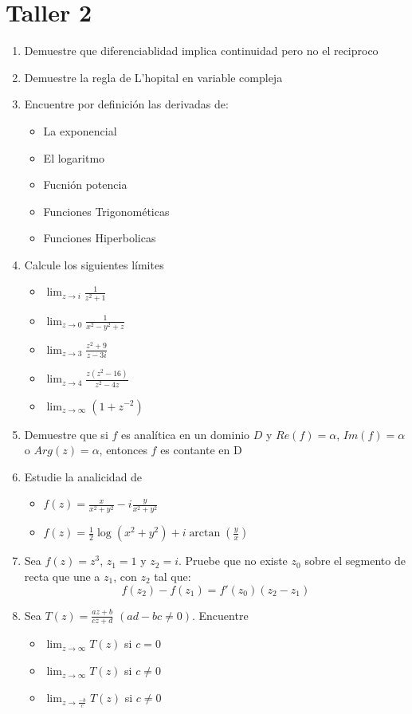 



\section*{Taller 2}
\begin{enumerate}
    \item Demuestre que diferenciablidad implica continuidad pero no el reciproco
    \item Demuestre la regla de L'hopital en variable compleja
    \item Encuentre por definición las derivadas de: 
        \begin{itemize}
            \item La exponencial 
            \item El logaritmo 
            \item Fucnión potencia
            \item Funciones Trigonométicas 
            \item Funciones Hiperbolicas
        \end{itemize}
    \item Calcule los siguientes límites
        \begin{itemize}
            \item $\lim_{z\to i} \frac{1}{z^{2}+1}$
            \item $\lim_{z\to 0} \frac{1}{x^{2}-y^{2}+z}$
            \item $\lim_{z\to 3} \frac{z^{2}+9}{z-3i}$
            \item $\lim_{z\to 4} \frac{z(z^{2}-16)}{z^{2}-4z}$
            \item $\lim_{z\to \infty} (1+z^{-2})$
        \end{itemize}
    \item Demuestre que si $f$ es analítica en un dominio $D$ y $Re(f)=\alpha$, $Im(f)=\alpha$ o $Arg(z)=\alpha$, entonces $f$ es contante en D
    \item Estudie la analicidad de 
        \begin{itemize}
            \item $f(z)=\frac{x}{x^{2}+y^{2}}-i\frac{y}{x^{2}+y^{2}}$
            \item $f(z)=\frac{1}{2}\log{(x^{2}+y^{2})}+i\arctan{\left(\frac{y}{x}\right)}$
        \end{itemize}
    \item Sea $f(z)=z^{3}$, $z_{1}=1$ y $z_{2}=i$. 
    Pruebe que no existe $z_{0}$ sobre el segmento de recta que une a $z_{1}$, con $z_{2}$ tal que: 
    $$f(z_2)-f(z_1)=f'(z_0)(z_2-z_1)$$
    \item Sea $T(z)=\frac{az+b}{cz+d}$ $(ad-bc\not=0)$.
    Encuentre
        \begin{itemize}
            \item $\lim_{z\to \infty} T(z)$ si $c=0$
            \item $\lim_{z\to \infty} T(z)$ si $c\not=0$
            \item $\lim_{z\to\frac{-b}{c}} T(z)$ si $c\not=0$
        \end{itemize}
\end{enumerate}


